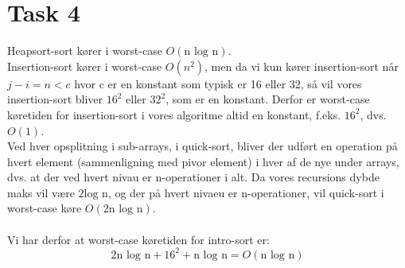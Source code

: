 \section{Task 4}

Heapsort-sort kører i worst-case $O(\text{n log n})$.\\
Insertion-sort kører i worst-case $O(n^2)$, men da vi kun kører insertion-sort når $j-i = n < c$ hvor c er en konstant som typisk er 16 eller 32, så vil vores insertion-sort bliver $16^2$ eller $32^2$, som er en konstant. Derfor er worst-case køretiden for insertion-sort i vores algoritme altid en konstant, f.eks. $16^2$, dvs. $O(1)$.\\
Ved hver opsplitning i sub-arrays, i quick-sort, bliver der udført en operation på hvert element (sammenligning med pivor element) i hver af de nye under arrays, dvs. at der ved hvert nivau er n-operationer i alt. Da vores recursions dybde maks vil være $2 \text{log n}$, og der på hvert nivaeu er n-operationer, vil quick-sort i worst-case køre $O(2\text{n log n})$.\\\\
Vi har derfor at worst-case køretiden for intro-sort er:
$$
2\text{n log n} + 16^2 + \text{n log n} = O(\text{n log n})
$$ 
